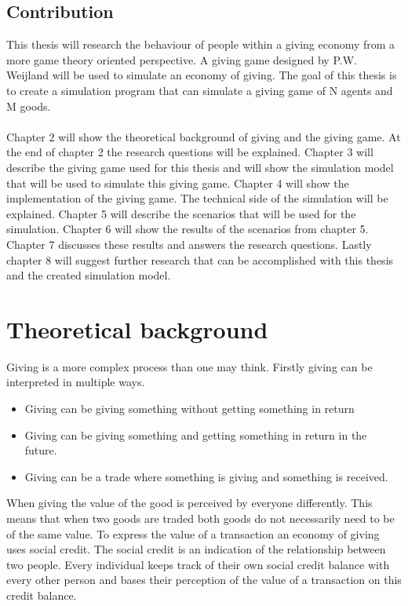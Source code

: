\documentclass[twoside,openright]{uva-bachelor-thesis}
\begin{document}
\section{Contribution}
This thesis will research the behaviour of people within a giving economy from a more game theory oriented perspective. A giving game designed by P.W. Weijland will be used to simulate an economy of giving. The goal of this thesis is to create a simulation program that can simulate a giving game of N agents and M goods. 
\\
\\
Chapter 2 will show the theoretical background of giving and the giving game. At the end of chapter 2 the research questions will be explained. Chapter 3 will describe the giving game used for this thesis and will show the simulation model that will be used to simulate this giving game. Chapter 4 will show the implementation of the giving game. The technical side of the simulation will be explained. Chapter 5 will describe the scenarios that will be used for the simulation. Chapter 6 will show the results of the scenarios from chapter 5. Chapter 7 discusses these results and answers the research questions. Lastly chapter 8 will suggest further research that can be accomplished with this thesis and the created simulation model.




\chapter{Theoretical background}
Giving is a more complex process than one may think. Firstly giving can be interpreted in multiple ways.
\begin{itemize}
  \item Giving can be giving something without getting something in return
  \item Giving can be giving something and getting something in return in the future.
  \item Giving can be a trade where something is giving and something is received.
\end{itemize}
When giving the value of the good is perceived by everyone differently. This means that when two goods are traded both goods do not necessarily need to be of the same value. To express the value of a transaction an economy of giving uses social credit. The social credit is an indication of the relationship between two people. Every individual keeps track of their own social credit balance with every other person and bases their perception of the value of a transaction on this credit balance.
\end{document}
